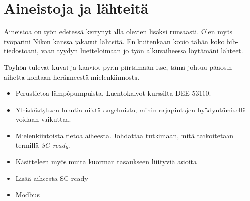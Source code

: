 \section{Aineistoja ja lähteitä}

  Aineistoa on työn edetessä kertynyt alla olevien lisäksi runsaasti. Olen myös työparini Nikon kanssa jakanut lähteitä. En kuitenkaan kopio tähän koko bib-tiedostoani, vaan tyydyn luetteloimaan jo työn alkuvaiheessa löytämäni lähteet.

  Töyhön tulevat kuvat ja kaaviot pyrin piirtämään itse, tämä johtuu pääosin aihetta kohtaan heränneestä mielenkiinnosta.

  \begin{itemize}

    \item Perustietoa lämpöpumpuista. Luentokalvot kurssilta DEE-53100. \parencite{kummu}
    \item Yleiskästyksen luontia niistä ongelmista, mihin rajapintojen hyödyntämisellä voidaan vaikuttaa. \parencite[Luku 3]{rautiainen}
    \item Mielenkiintoista tietoa aiheesta. Johdattaa tutkimaan, mitä tarkoitetaan termillä \emph{SG-ready}. \parencite{ModelBasedFlexibilityAssessment}
    \item Käsitteleen myös muita kuorman tasaukseen liittyviä asioita \parencite{ShenJiangLi}
    \item Lisää aiheesta SG-ready \parencite{fischerTriebelSelinger}
    \item Modbus \parencite{sousaPortugal}
  \end{itemize}
